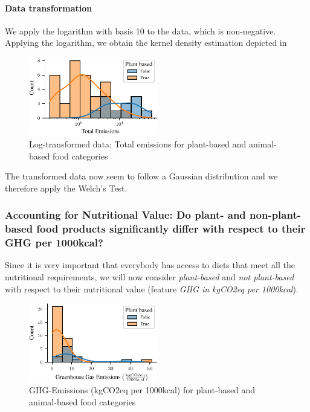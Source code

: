 \documentclass{article}
\begin{document}
\paragraph*{Data transformation}
We apply the logarithm with basis 10 to the data, which is non-negative. Applying the logarithm, we obtain the kernel density estimation depicted in  

\begin{figure}[h]
  \centering
  \includegraphics[width=0.5\textwidth]{figures/emissions-log.pdf}
  \caption{Log-transformed data: Total emissions for plant-based and animal-based food categories}
  \label{fig:emissions-log}
\end{figure}

The transformed data now seem to follow a  Gaussian distribution and we therefore apply the Welch's Test.

\subsubsection*{Accounting  for Nutritional Value: Do plant- and non-plant-based food products significantly differ with respect to their GHG per 1000kcal?}

Since it is very important that everybody has access to diets that meet all the nutritional requirements, we will now consider \textit{plant-based} and \textit{not plant-based} with respect to their nutritional value (feature \textit{GHG in kgCO2eq per 1000kcal}).



\begin{figure}[h]
  \centering
  \includegraphics[width=0.5\textwidth]{figures/ghg.pdf}
  \caption{GHG-Emissions  (kgCO2eq per 1000kcal) for plant-based and animal-based food categories}
  \label{fig:ghg}
\end{figure}
\end{document}
